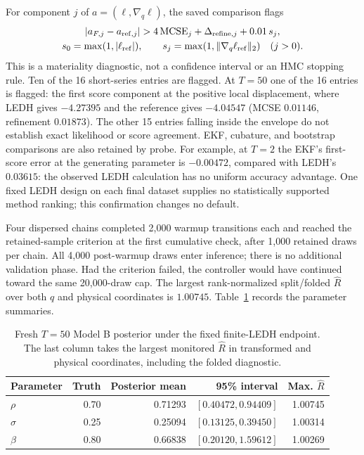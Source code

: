 For component $j$ of $a=(\ell,\nabla_q\ell)$, the saved comparison flags
\begin{gather*}
 |a_{F,j}-a_{{\rm ref},j}|>
 4\,\mathrm{MCSE}_j+\Delta_{{\rm refine},j}+0.01\,s_j,\\
 s_0=\max(1,|\ell_{\rm ref}|),\qquad
 s_j=\max(1,\|\nabla_q\ell_{\rm ref}\|_2)\quad(j>0).
\end{gather*}
This is a materiality diagnostic, not a confidence interval or an HMC
stopping rule.  Ten of the 16 short-series entries are flagged.  At $T=50$
one of the 16 entries is flagged: the first score component at the positive
local displacement, where LEDH gives $-4.27395$ and the reference gives
$-4.04547$ (MCSE $0.01146$, refinement $0.01873$).  The other 15 entries
falling inside the envelope do not establish exact likelihood or score
agreement.  EKF, cubature, and bootstrap comparisons are also retained by
probe.  For example, at $T=2$ the EKF's first-score error at the generating
parameter is $-0.00472$, compared with LEDH's $0.03615$: the observed LEDH
calculation has no uniform accuracy advantage.  One fixed LEDH design on
each final dataset supplies no statistically supported method ranking;
this confirmation changes no default.

Four dispersed chains completed 2,000 warmup transitions each and reached
the retained-sample criterion at the first cumulative check, after 1,000
retained draws per chain.  All 4,000 post-warmup draws enter inference;
there is no additional validation phase.  Had the criterion failed, the
controller would have continued toward the same 20,000-draw cap.
The largest rank-normalized split/folded $\widehat R$ over both $q$ and
physical coordinates is $1.00745$.
Table~\ref{tab:bf-structural-tanh-posterior} records the parameter summaries.

\begin{table}[htbp]
\centering\small
\caption{Fresh $T=50$ Model B posterior under the fixed finite-LEDH endpoint.
The last column takes the largest monitored $\widehat R$ in transformed and
physical coordinates, including the folded diagnostic.}
\label{tab:bf-structural-tanh-posterior}
\begin{tabular}{lrrrr}
\toprule
Parameter & Truth & Posterior mean & 95\% interval & Max. $\widehat R$\\
\midrule
$\rho$ & 0.70 & 0.71293 & $[0.40472,0.94409]$ & 1.00745\\
$\sigma$ & 0.25 & 0.25094 & $[0.13125,0.39450]$ & 1.00314\\
$\beta$ & 0.80 & 0.66838 & $[0.20120,1.59612]$ & 1.00269\\
\bottomrule
\end{tabular}
\end{table}

